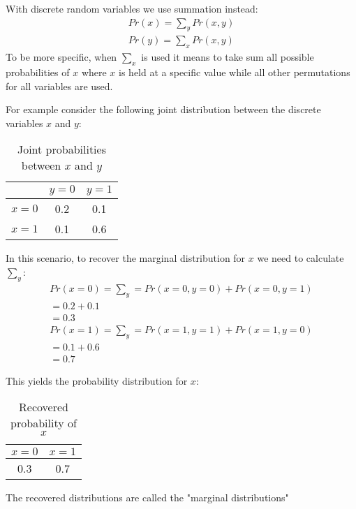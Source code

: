 \documentclass{article}
\begin{document}
With discrete random variables we use summation instead:
\begin{align}\label{eq:marginalize-cont}
	Pr\left( x \right) = \sum_{y} Pr\left( x,y \right) \\
	Pr\left( y \right) = \sum_{x} Pr\left( x,y \right) 
\end{align}
\noindent
To be more specific, when $\sum_{x}$ is used it means to take sum all possible probabilities of $x$ where $x$ is held at a specific value while all other permutations for all variables are used.

For example consider the following joint distribution between the discrete variables $x$ and $y$:

\begin{table}[htpb]
	\centering
	\caption{Joint probabilities between $x$ and $y$}
	\label{tab:joint}
	\begin{tabular}{ccc}
	 	 & $y=0$  & $y=1$ \\
		\hline
		$x=0$ \vline & 0.2 & 0.1 \\
		$x=1$ \vline & 0.1 & 0.6 \\
	\end{tabular}
\end{table}

In this scenario, to recover the marginal distribution for $x$ we need to calculate $\sum_{y}$:
\begin{align*}
	Pr\left( x=0 \right) =  \sum_{y}=Pr\left( x=0, y=0 \right) + Pr\left( x=0,y=1 \right) \\
	= 0.2 + 0.1 \\
	= 0.3
\end{align*}
\begin{align*}
	Pr\left( x=1 \right) = \sum_{y}=Pr\left( x=1,y=1 \right) + Pr\left( x=1,y=0 \right) \\
	= 0.1 + 0.6 \\
	= 0.7
\end{align*}

This yields the probability distribution for $x$:

\begin{table}[htpb]
	\centering
	\caption{Recovered probability of $x$}
	\label{tab:x-recover}
	\begin{tabular}{cc}
		$x=0$  & $x=1$ \\
		\hline
		0.3 & 0.7

	\end{tabular}
\end{table}

The recovered distributions are called the "marginal distributions"
\end{document}
